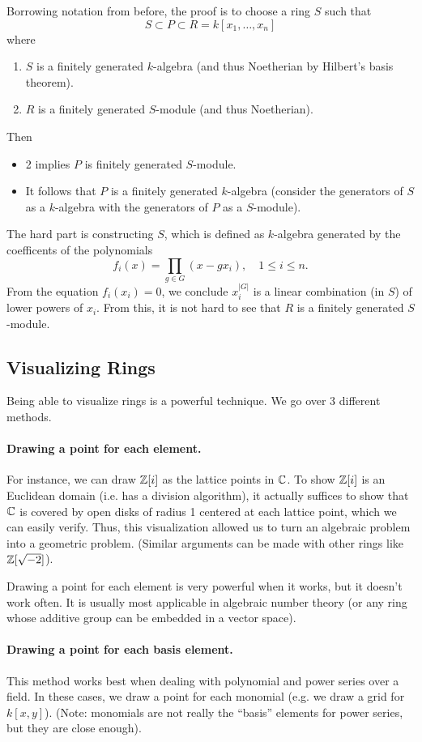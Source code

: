 Borrowing notation from before, the proof is to choose a ring $S$ such that
\[
    S \subset P \subset R = k[x_1, \dots, x_n]
\]
where
\begin{enumerate}
    \item $S$ is a finitely generated $k$-algebra (and thus Noetherian by Hilbert's basis theorem).
    \item $R$ is a finitely generated $S$-module (and thus Noetherian).
\end{enumerate}
Then
\begin{itemize}
    \item 2 implies $P$ is finitely generated $S$-module.
    \item It follows that $P$ is a finitely generated $k$-algebra (consider the generators of $S$ as a $k$-algebra with the generators of $P$ as a $S$-module).
\end{itemize}
The hard part is constructing $S$, which is defined as $k$-algebra generated by the coefficents of the polynomials
\[
    f_i(x) = \prod_{g \in G} (x-gx_i), \quad 1 \leq i \leq n.
\]
From the equation $f_i(x_i) = 0$, we conclude $x_i^{|G|}$ is a linear combination (in $S$) of lower powers of $x_i$. From this, it is not hard to see that $R$ is a finitely generated $S$-module.

\subsection{Visualizing Rings}
Being able to visualize rings is a powerful technique. We go over 3 different methods.

\paragraph{Drawing a point for each element.} For instance, we can draw ${\mathbb Z}[i]$ as the lattice points in ${\mathbb C}$. To show ${\mathbb Z}[i]$ is an Euclidean domain (i.e. has a division algorithm), it actually suffices to show that ${\mathbb C}$ is covered by open disks of radius 1 centered at each lattice point, which we can easily verify. Thus, this visualization allowed us to turn an algebraic problem into a geometric problem. (Similar arguments can be made with other rings like ${\mathbb Z}[\sqrt{-2}]$).

Drawing a point for each element is very powerful when it works, but it doesn't work often. It is usually most applicable in algebraic number theory (or any ring whose additive group can be embedded in a vector space).

\paragraph{Drawing a point for each basis element.} This method works best when dealing with polynomial and power series over a field. In these cases, we draw a point for each monomial (e.g. we draw a grid for $k[x,y]$). (Note: monomials are not really the ``basis'' elements for power series, but they are close enough).

